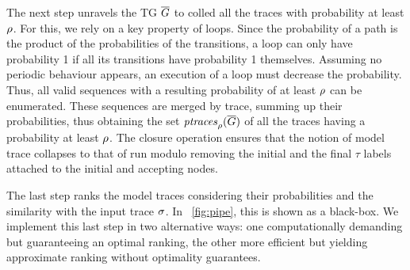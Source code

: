 The next step unravels the TG $\overline{G}$ to colled all the traces with probability at least $\rho$. For this, we rely on a key 
property of loops. Since the probability of a path is the product of the probabilities of the transitions, a loop can only have 
probability 1 if all its transitions have probability 1 themselves. Assuming no periodic behaviour appears, an execution of a 
loop must decrease the probability. Thus, all valid sequences with a resulting probability of at least $\rho$ can be enumerated. 
These sequences are merged by trace, summing up their probabilities, thus obtaining the set $\mathit{ptraces}_{\rho}(\overline{G})$
of all the traces having a probability at least $\rho$. The closure operation ensures that the notion of model trace collapses to 
that of run modulo removing the initial and the final $\tau$ labels attached to the initial and accepting nodes.

The last step ranks the model traces considering their probabilities and the similarity with the input trace $\sigma$. In 
\figurename~\ref{fig:pipe}, this is shown as a black-box. We implement this last step in two alternative ways: one 
computationally demanding but guaranteeing an optimal ranking, the other more efficient but yielding approximate ranking without 
optimality guarantees.

\endinput


%
We can show that the TG obtained in Definition \ref{def:transf} preserves the same set of probabilistic traces associated by the reachability graph. The proof is omitted due to the lack of space.

\begin{example}
\figurename~\ref{fig:lmc} shows the TG obtained from the reachability graph in \figurename~\ref{fig:rg}. Nodes are labeled with the firing
transition labels (in green), and edges preserve the probabilistic information from the reachability graph (in red). Intuitively, when a
new initial node \textit{\textbf{i}} is inserted, we preserve all the initial probabilistic choices that a transition is fired from an initial
marking $M$, while the intermediate edges inherit the probabilistic choice of the firing transition from the subsequent choices. When
a new final node \textit{\textbf{f}} is added, such edges always have probability $1$, and thus do not interfere with the
initial traces' probability.
\end{example}

